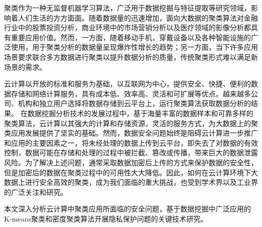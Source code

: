 \begin{cabstract}
%

聚类作为一种无监督机器学习算法，广泛用于数据挖掘与特征提取等研究领域，影响着人们生活的方方面面。随着数据量的迅速增加，面向大数据的聚类算法对金融行业中的股票投资分析，商业环境中的市场营销分析以及医疗领域的影像分析都具有重要应用价值。然而，一方面，随着移动手机，穿戴设备以及各种智能设施的广泛使用，用于聚类分析的数据量呈现爆炸性增长的趋势；另一方面，当下许多应用场景要求联合多方数据进行聚类以提升数据分析的质量，传统聚类形式难以满足新场景的需求。

云计算以开放的标准和服务为基础，以互联网为中心，提供安全、快捷、便利的数据存储和网络计算服务，具有成本低、效率高、灵活和可扩展等优点。越来越多公司、机构和独立用户选择将数据存储到云平台上，运行聚类算法获取数据分析的结果。
在数据挖掘分析技术的发展过程中，基于海量丰富的数据样本和可靠多样的聚类算法，云计算以其强大的计算和存储资源，灵活的服务方式，为大数据上的聚类应用发展提供了坚实的基础。然而，数据安全问题始终是阻碍云计算进一步推广和应用的主要因素之一，将未经处理的数据上传到云平台，即失去了对数据的有效控制，数据可能在存储和处理的过程中被拦截、篡改或传播，带来巨大的数据泄露风险。为了解决上述问题，通常采取数据加密后上传的方式来保护数据的安全性，但是加密后的数据在聚类过程中的可用性大大降低。因此，如何在云计算环境下大数据上进行安全高效的聚类，成为我们面临的重大挑战，也受到学术界以及工业界的广泛关注和研究。

本文深入分析云计算中聚类应用所面临的安全问题，基于数据挖掘中广泛应用的K-means聚类和密度聚类算法开展隐私保护问题的关键技术研究。


\end{cabstract}

